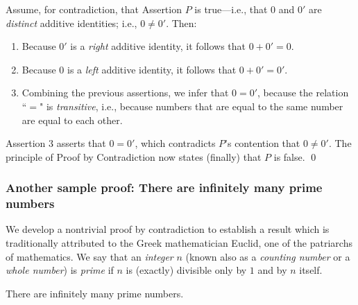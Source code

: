 \medskip

Assume, for contradiction, that Assertion $P$ is true---i.e., that $0$ and $0'$ are {\em distinct} additive identities; i.e., $0 \neq 0'$.  Then:
\begin{enumerate}
\item
Because $0'$ is a {\em right} additive identity, it follows that $0 + 0' = 0$.
\item
Because $0$ is a {\em left} additive identity, it follows that $0 + 0' = 0'$.
\item
Combining the previous assertions, we infer that $0 = 0'$, because the relation ``$=$" is {\em transitive}, i.e., because numbers that are equal to the same number are equal to each other.
\end{enumerate}
Assertion 3 asserts that $0 = 0'$, which contradicts $P$'s contention that $0 \neq 0'$.   The principle of Proof by Contradiction now states (finally) that $P$ is false. \qed



\subsubsection{Another sample proof: There are infinitely many prime numbers}
\label{sec:sample-contradictions}

 
We develop a nontrivial proof by contradiction to establish a result which is traditionally attributed to the Greek mathematician Euclid, one of the patriarchs of mathematics.  We say that an {\it integer} $n$ (known also as a {\it counting number} or a {\it whole number}) is {\it prime} if $n$ is (exactly) divisible only by $1$ and by $n$ itself.

\begin{prop}
\label{thm:Primes-infinite}
There are infinitely many prime numbers.
\end{prop}

